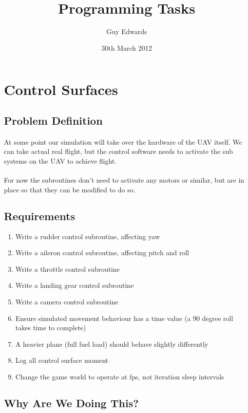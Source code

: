 \documentclass[11pt]{book}
\title{\textbf{Programming Tasks}}
\author{Guy Edwards}
\date{30th March 2012}
\begin{document}
\section{Control Surfaces}

\subsection{Problem Definition}

\paragraph{} At some point our simulation will take over the hardware of the
UAV itself. We can take actual real flight, but the control software needs to
activate the sub systems on the UAV to achieve flight.

\paragraph{} For now the subroutines don't need to activate any motors or
similar, but are in place so that they can be modified to do so.

\subsection{Requirements}

\begin{enumerate}
\item Write a rudder control subroutine, affecting yaw
\item Write a aileron control subroutine, affecting pitch and roll
\item Write a throttle control subroutine
\item Write a landing gear control subroutine
\item Write a camera control subroutine
\item Ensure simulated movement behaviour has a time value (a 90 degree roll takes time to complete)
\item A heavier plane (full fuel load) should behave slightly differently
\item Log all control surface moment
\item Change the game world to operate at fps, not iteration sleep intervals
\end{enumerate}

\subsection{Why Are We Doing This?}
\end{document}
